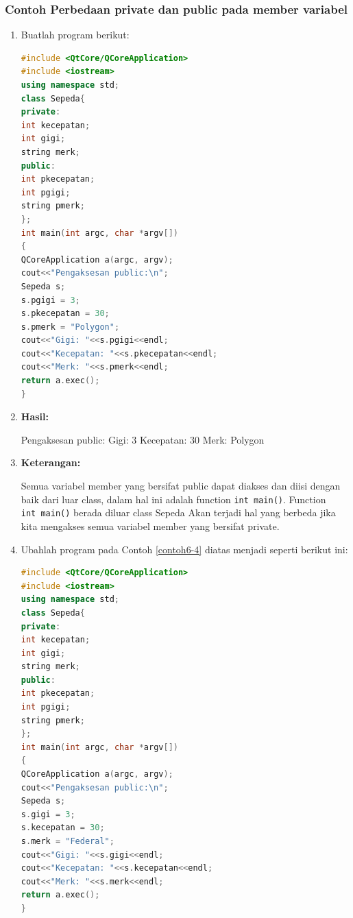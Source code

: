 \subsubsection*{Contoh  Perbedaan private dan public pada member variabel}
\begin{enumerate}
	

	\item Buatlah program berikut:
	
\begin{lstlisting}[language=c++, caption=Public pada member variabel, label=contoh6-4]
#include <QtCore/QCoreApplication>
#include <iostream>
using namespace std;
class Sepeda{
private:
int kecepatan;
int gigi;
string merk;
public:
int pkecepatan;
int pgigi;
string pmerk;
};
int main(int argc, char *argv[])
{
QCoreApplication a(argc, argv);
cout<<"Pengaksesan public:\n";
Sepeda s;
s.pgigi = 3;
s.pkecepatan = 30;
s.pmerk = "Polygon";
cout<<"Gigi: "<<s.pgigi<<endl;
cout<<"Kecepatan: "<<s.pkecepatan<<endl;
cout<<"Merk: "<<s.pmerk<<endl;
return a.exec();
}
\end{lstlisting}
	
\item 	\textbf{Hasil:}
	
	\begin{lcverbatim}
	Pengaksesan public:
	Gigi: 3
	Kecepatan: 30
	Merk: Polygon
	\end{lcverbatim}
	
\item 	\textbf{Keterangan:}
	
	Semua variabel member yang bersifat public dapat diakses dan diisi
	dengan baik dari luar class, dalam hal ini adalah function
	\texttt{int\ main()}. Function \texttt{int\ main()} berada diluar class
	Sepeda Akan terjadi hal yang berbeda jika kita mengakses semua variabel
	member yang bersifat private.
	
\item 	Ubahlah program pada Contoh \ref{contoh6-4} diatas menjadi seperti berikut ini:
	
\begin{lstlisting}[language=c++, caption=Privat pada member variabel, label=contoh6-5]
#include <QtCore/QCoreApplication>
#include <iostream>
using namespace std;
class Sepeda{
private:
int kecepatan;
int gigi;
string merk;
public:
int pkecepatan;
int pgigi;
string pmerk;
};
int main(int argc, char *argv[])
{
QCoreApplication a(argc, argv);
cout<<"Pengaksesan public:\n";
Sepeda s;
s.gigi = 3;
s.kecepatan = 30;
s.merk = "Federal";
cout<<"Gigi: "<<s.gigi<<endl;
cout<<"Kecepatan: "<<s.kecepatan<<endl;
cout<<"Merk: "<<s.merk<<endl;
return a.exec();
}
\end{lstlisting}
	

\end{enumerate}
